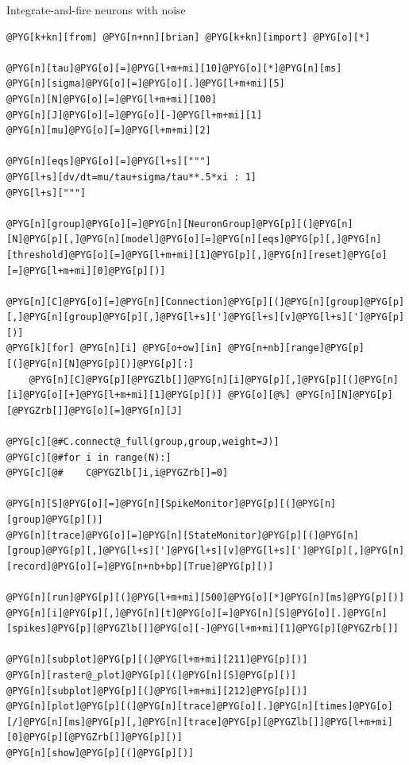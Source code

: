 \documentclass[letterpaper,10pt,english]{manual}
\begin{document}
Integrate-and-fire neurons with noise

\begin{Verbatim}[commandchars=@\[\]]
@PYG[k+kn][from] @PYG[n+nn][brian] @PYG[k+kn][import] @PYG[o][*]

@PYG[n][tau]@PYG[o][=]@PYG[l+m+mi][10]@PYG[o][*]@PYG[n][ms]
@PYG[n][sigma]@PYG[o][=]@PYG[o][.]@PYG[l+m+mi][5]
@PYG[n][N]@PYG[o][=]@PYG[l+m+mi][100]
@PYG[n][J]@PYG[o][=]@PYG[o][-]@PYG[l+m+mi][1]
@PYG[n][mu]@PYG[o][=]@PYG[l+m+mi][2]

@PYG[n][eqs]@PYG[o][=]@PYG[l+s]["""]
@PYG[l+s][dv/dt=mu/tau+sigma/tau**.5*xi : 1]
@PYG[l+s]["""]

@PYG[n][group]@PYG[o][=]@PYG[n][NeuronGroup]@PYG[p][(]@PYG[n][N]@PYG[p][,]@PYG[n][model]@PYG[o][=]@PYG[n][eqs]@PYG[p][,]@PYG[n][threshold]@PYG[o][=]@PYG[l+m+mi][1]@PYG[p][,]@PYG[n][reset]@PYG[o][=]@PYG[l+m+mi][0]@PYG[p][)]

@PYG[n][C]@PYG[o][=]@PYG[n][Connection]@PYG[p][(]@PYG[n][group]@PYG[p][,]@PYG[n][group]@PYG[p][,]@PYG[l+s][']@PYG[l+s][v]@PYG[l+s][']@PYG[p][)]
@PYG[k][for] @PYG[n][i] @PYG[o+ow][in] @PYG[n+nb][range]@PYG[p][(]@PYG[n][N]@PYG[p][)]@PYG[p][:]
    @PYG[n][C]@PYG[p][@PYGZlb[]]@PYG[n][i]@PYG[p][,]@PYG[p][(]@PYG[n][i]@PYG[o][+]@PYG[l+m+mi][1]@PYG[p][)] @PYG[o][@%] @PYG[n][N]@PYG[p][@PYGZrb[]]@PYG[o][=]@PYG[n][J]

@PYG[c][@#C.connect@_full(group,group,weight=J)]
@PYG[c][@#for i in range(N):]
@PYG[c][@#    C@PYGZlb[]i,i@PYGZrb[]=0]

@PYG[n][S]@PYG[o][=]@PYG[n][SpikeMonitor]@PYG[p][(]@PYG[n][group]@PYG[p][)]
@PYG[n][trace]@PYG[o][=]@PYG[n][StateMonitor]@PYG[p][(]@PYG[n][group]@PYG[p][,]@PYG[l+s][']@PYG[l+s][v]@PYG[l+s][']@PYG[p][,]@PYG[n][record]@PYG[o][=]@PYG[n+nb+bp][True]@PYG[p][)]

@PYG[n][run]@PYG[p][(]@PYG[l+m+mi][500]@PYG[o][*]@PYG[n][ms]@PYG[p][)]
@PYG[n][i]@PYG[p][,]@PYG[n][t]@PYG[o][=]@PYG[n][S]@PYG[o][.]@PYG[n][spikes]@PYG[p][@PYGZlb[]]@PYG[o][-]@PYG[l+m+mi][1]@PYG[p][@PYGZrb[]]

@PYG[n][subplot]@PYG[p][(]@PYG[l+m+mi][211]@PYG[p][)]
@PYG[n][raster@_plot]@PYG[p][(]@PYG[n][S]@PYG[p][)]
@PYG[n][subplot]@PYG[p][(]@PYG[l+m+mi][212]@PYG[p][)]
@PYG[n][plot]@PYG[p][(]@PYG[n][trace]@PYG[o][.]@PYG[n][times]@PYG[o][/]@PYG[n][ms]@PYG[p][,]@PYG[n][trace]@PYG[p][@PYGZlb[]]@PYG[l+m+mi][0]@PYG[p][@PYGZrb[]]@PYG[p][)]
@PYG[n][show]@PYG[p][(]@PYG[p][)]
\end{Verbatim}

\resetcurrentobjects
\hypertarget{--doc-examples-misc_parallelpython}{}
\end{document}
